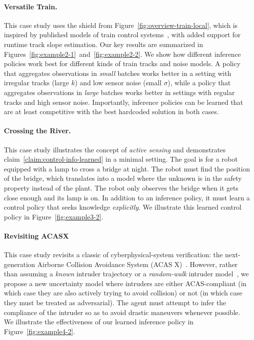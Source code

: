 \documentclass[acmsmall,screen,nonacm]{acmart}
\begin{document}
\paragraph{Versatile Train.} This case study uses the shield from Figure~\ref{fig:overview-train-local}, which is inspired by published models of train control systems~\cite{platzer2009european,kabra2022verified}, with added support for runtime track slope estimation. Our key results are summarized in Figures~\ref{fig:example2-1}~and~\ref{fig:example2-2}. We show how different inference policies work best for different kinds of train tracks and noise models. A policy that aggregates observations in \emph{small} batches works better in a setting with irregular tracks (large $k$) and low sensor noise (small $\sigma$), while a policy that aggregates observations in \emph{large} batches works better in settings with regular tracks and high sensor noise. Importantly, inference policies can be learned that are at least competitive with the best hardcoded solution in both cases. 

\paragraph{Crossing the River.} This case study illustrates the concept of \emph{active sensing} and demonstrates claim~\ref{claim:control-info-learned} in a minimal setting. The goal is for a robot equipped with a lamp to cross a bridge at night. The robot must find the position of the bridge, which translates into a model where the unknown is in the {safety property} instead of the plant. The robot only observes the bridge when it gets close enough and its lamp is on. In addition to an inference policy, it must learn a control policy that seeks knowledge \emph{explicitly}. We illustrate this learned control policy in Figure~\ref{fig:example3-2}.

\paragraph{Revisiting ACASX} This case study revisits a classic of cyberphysical-system verification: the next-generation Airborne Collision Avoidance System (ACAS X)~\cite{jeannin2015formally}. However, rather than assuming a \emph{known} intruder trajectory or a \emph{random-walk} intruder model~\cite{kochenderfer2012next}, we propose a new uncertainty model where intruders are either ACAS-compliant (in which case they are also actively trying to avoid collision) or not (in which case they must be treated as adversarial). The agent must attempt to infer the compliance of the intruder so as to avoid drastic maneuvers whenever possible. We illustrate the effectiveness of our learned inference policy in Figure~\ref{fig:example4-2}.
\end{document}
